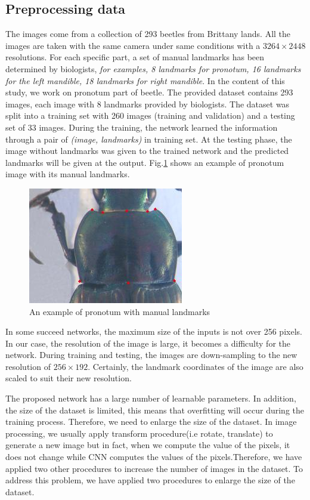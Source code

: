\documentclass[conference]{IEEEtran}
\begin{document}
\subsection{Preprocessing data}
The images come from a collection of 293 beetles from Brittany lands. All the images are taken with the same camera under same conditions with a $3264 \times 2448$ resolutions. For each specific part, a set of manual landmarks has been determined by biologists, \textit{for examples, 8 landmarks for pronotum, 16 landmarks for the left mandible, 18 landmarks for right mandible}. In the content of this study, we work on pronotum part of beetle. The provided dataset contains 293 images, each image with 8 landmarks provided by biologists. The dataset was split into a training set with 260 images (training and validation) and a testing set of 33 images. During the training, the network learned the information through a pair of \textit{(image, landmarks)} in training set. At the testing phase, the image without landmarks was given to the trained network and the predicted landmarks will be given at the output. Fig.\ref{figpronotum} shows an example of pronotum image with its manual landmarks.

\begin{figure}[htbp]
	\centerline{\includegraphics[scale=0.8]{images/pronotum}}
	\caption{An example of pronotum with manual landmarks}
	\label{figpronotum}
\end{figure}

In some succeed networks\cite{krizhevsky2012imagenet}\cite{sun2013deep}\cite{cintas2016automatic}, the maximum size of the inputs is not over 256 pixels. In our case, the resolution of the image is large, it becomes a difficulty for the network. During training and testing, the images are down-sampling to the new resolution of $256 \times 192$. Certainly, the landmark coordinates of the image are also scaled to suit their new resolution. 

The proposed network has a large number of learnable parameters. In addition, the size of the dataset is limited, this means that overfitting will occur during the training process. Therefore, we need to enlarge the size of the dataset. In image processing, we usually apply transform procedure(i.e rotate, translate) to generate a new image but in fact, when we compute the value of the pixels, it does not change while CNN computes the values of the pixels.Therefore, we have applied two other procedures to increase the number of images in the dataset. To address this problem, we have applied two procedures to enlarge the size of the dataset.
\end{document}

